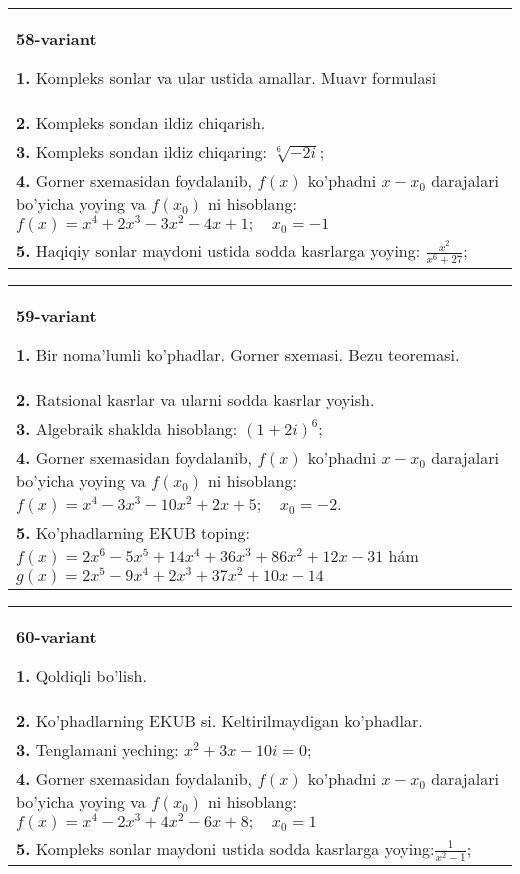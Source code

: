 \documentclass{article}
\begin{document}
\begin{tabular}{m{17cm}}
\textbf{58-variant}
\newline

\textbf{1.} Kompleks sonlar va ular ustida amallar. Muavr formulasi  \\
\textbf{2.} Kompleks sondan ildiz chiqarish. \\
\textbf{3.} Kompleks sondan ildiz chiqaring: $\sqrt[6]{-2 i}$; \\
\textbf{4.} Gorner sxemasidan foydalanib, $f(x)$ ko’phadni $x-x_0$ darajalari bo’yicha yoying va $f\left(x_0\right)$ ni hisoblang: $f(x)=x^4+2 x^3-3 x^2-4 x+1 ; \quad x_0=-1$ \\
\textbf{5.} Haqiqiy sonlar maydoni ustida sodda kasrlarga yoying:  $\frac{x^2}{x^6+27}$; \\

\end{tabular}
\vspace{1cm}


\begin{tabular}{m{17cm}}
\textbf{59-variant}
\newline

\textbf{1.} Bir noma’lumli ko’phadlar. Gorner sxemasi. Bezu teoremasi.  \\
\textbf{2.} Ratsional kasrlar va ularni sodda kasrlar yoyish. \\
\textbf{3.} Algebraik shaklda hisoblang: $(1+2 i)^6$; \\
\textbf{4.} Gorner sxemasidan foydalanib, $f(x)$ ko’phadni $x-x_0$ darajalari bo’yicha yoying va $f\left(x_0\right)$ ni hisoblang: $f(x)=x^4-3 x^3-10 x^2+2 x+5 ; \quad x_0=-2$. \\
\textbf{5.} Ko’phadlarning EKUB toping:  $f(x)=2 x^6-5 x^5+14 x^4+36 x^3+86 x^2+12 x-31$ hám $g(x)=2 x^5-9 x^4+2 x^3+37 x^2+10 x-14$ \\

\end{tabular}
\vspace{1cm}


\begin{tabular}{m{17cm}}
\textbf{60-variant}
\newline

\textbf{1.} Qoldiqli bo’lish.  \\
\textbf{2.} Ko’phadlarning EKUB si. Keltirilmaydigan ko’phadlar. \\
\textbf{3.} Tenglamani yeching:  $x^2+3 x-10 i=0$; \\
\textbf{4.} Gorner sxemasidan foydalanib, $f(x)$ ko’phadni $x-x_0$ darajalari bo’yicha yoying va $f\left(x_0\right)$ ni hisoblang: $f(x)=x^4-2 x^3+4 x^2-6 x+8 ; \quad x_0=1$ \\
\textbf{5.} Kompleks sonlar maydoni ustida sodda kasrlarga yoying:$\frac{1}{x^2-1}$; \\

\end{tabular}
\vspace{1cm}
\end{document}
